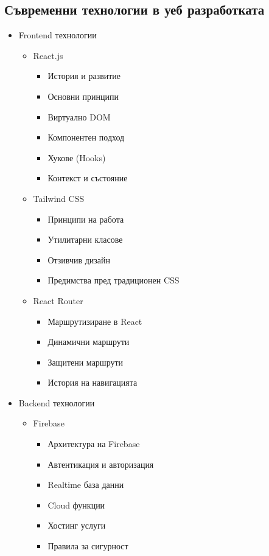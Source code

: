 \documentclass[12pt,a4paper]{article}
\begin{document}
\subsection{Съвременни технологии в уеб разработката}
\begin{itemize}
    \item Frontend технологии
    \begin{itemize}
        \item React.js
        \begin{itemize}
            \item История и развитие
            \item Основни принципи
            \item Виртуално DOM
            \item Компонентен подход
            \item Хукове (Hooks)
            \item Контекст и състояние
        \end{itemize}
        
        \item Tailwind CSS
        \begin{itemize}
            \item Принципи на работа
            \item Утилитарни класове
            \item Отзивчив дизайн
            \item Предимства пред традиционен CSS
        \end{itemize}
        
        \item React Router
        \begin{itemize}
            \item Маршрутизиране в React
            \item Динамични маршрути
            \item Защитени маршрути
            \item История на навигацията
        \end{itemize}
    \end{itemize}
    
    \item Backend технологии
    \begin{itemize}
        \item Firebase
        \begin{itemize}
            \item Архитектура на Firebase
            \item Автентикация и авторизация
            \item Realtime база данни
            \item Cloud функции
            \item Хостинг услуги
            \item Правила за сигурност
        \end{itemize}
        

\end{itemize}
\end{itemize}
\end{document}
